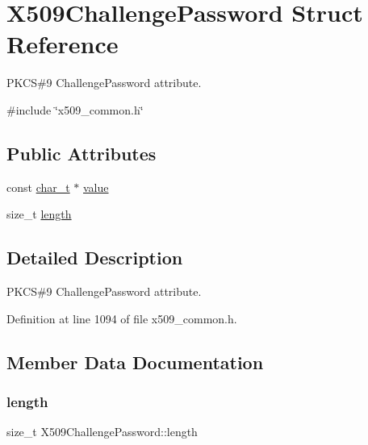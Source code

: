 \hypertarget{structX509ChallengePassword}{}\section{X509\+Challenge\+Password Struct Reference}
\label{structX509ChallengePassword}


P\+K\+CS\#9 Challenge\+Password attribute.  




{\ttfamily \#include \char`\"{}x509\+\_\+common.\+h\char`\"{}}

\subsection*{Public Attributes}
\begin{DoxyCompactItemize}
\item 
const \hyperlink{compiler__port_8h_a40bb5262bf908c328fbcfbe5d29d0201}{char\+\_\+t} $\ast$ \hyperlink{structX509ChallengePassword_a1336a40b4d952be8d6689fea03e28a01}{value}
\item 
size\+\_\+t \hyperlink{structX509ChallengePassword_a13c0c6c3c71eb74a5d1ffca2e7a011fa}{length}
\end{DoxyCompactItemize}


\subsection{Detailed Description}
P\+K\+CS\#9 Challenge\+Password attribute. 

Definition at line 1094 of file x509\+\_\+common.\+h.



\subsection{Member Data Documentation}
\mbox{\label{structX509ChallengePassword_a13c0c6c3c71eb74a5d1ffca2e7a011fa}} 
\subsubsection{\texorpdfstring{length}{length}}
{\footnotesize\ttfamily size\+\_\+t X509\+Challenge\+Password\+::length}



